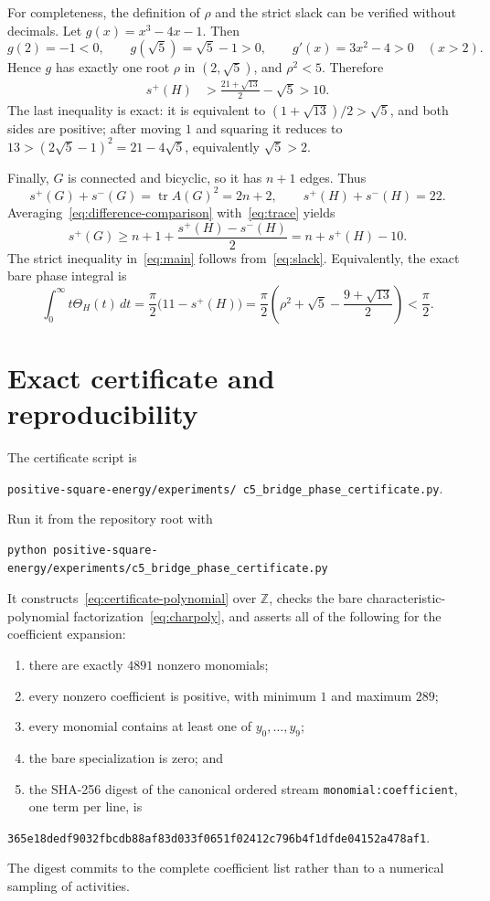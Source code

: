 \documentclass[11pt]{article}
\theoremstyle{remark}
\newcommand{\tr}{\operatorname{tr}}
\begin{document}
For completeness, the definition of $\rho$ and the strict slack can be
verified without decimals.  Let $g(x)=x^3-4x-1$.  Then
\[
 g(2)=-1<0,
 \qquad
 g(\sqrt5)=\sqrt5-1>0,
 \qquad
 g'(x)=3x^2-4>0\quad(x>2).
\]
Hence $g$ has exactly one root $\rho$ in $(2,\sqrt5)$, and $\rho^2<5$.
Therefore
\begin{align}
 s^+(H)
 &>\frac{21+\sqrt{13}}2-\sqrt5>10.\label{eq:slack}
\end{align}
The last inequality is exact: it is equivalent to
$(1+\sqrt{13})/2>\sqrt5$, and both sides are positive; after moving $1$ and
squaring it reduces to $13>(2\sqrt5-1)^2=21-4\sqrt5$, equivalently
$\sqrt5>2$.

Finally, $G$ is connected and bicyclic, so it has $n+1$ edges.  Thus
\begin{equation}\label{eq:trace}
 s^+(G)+s^-(G)=\tr A(G)^2=2n+2,
 \qquad
 s^+(H)+s^-(H)=22.
\end{equation}
Averaging~\eqref{eq:difference-comparison} with~\eqref{eq:trace} yields
\[
 s^+(G)\geq n+1+\frac{s^+(H)-s^-(H)}2
          =n+s^+(H)-10.
\]
The strict inequality in~\eqref{eq:main} follows from~\eqref{eq:slack}.
Equivalently, the exact bare phase integral is
\[
 \int_0^\infty t\Theta_H(t)\,dt
 =\frac\pi2\bigl(11-s^+(H)\bigr)
 =\frac\pi2\left(
 \rho^2+\sqrt5-\frac{9+\sqrt{13}}2\right)<\frac\pi2.
\]

\appendix
\section{Exact certificate and reproducibility}\label{app:certificate}

The certificate script is
\begin{center}
\texttt{positive-square-energy/experiments/\allowbreak
c5\_bridge\_phase\_certificate.py}.
\end{center}
Run it from the repository root with
\begin{verbatim}
python positive-square-energy/experiments/c5_bridge_phase_certificate.py
\end{verbatim}
It constructs~\eqref{eq:certificate-polynomial} over $\mathbb Z$, checks the
bare characteristic-polynomial factorization~\eqref{eq:charpoly}, and asserts
all of the following for the coefficient expansion:
\begin{enumerate}
\item there are exactly $4891$ nonzero monomials;
\item every nonzero coefficient is positive, with minimum $1$ and maximum
      $289$;
\item every monomial contains at least one of $y_0,\ldots,y_9$;
\item the bare specialization is zero; and
\item the SHA-256 digest of the canonical ordered stream
      \texttt{monomial:coefficient}, one term per line, is
\end{enumerate}
\begin{center}
\texttt{365e18dedf9032fbcdb88af83d033f0651f02412c796b4f1dfde04152a478af1}.
\end{center}
The digest commits to the complete coefficient list rather than to a
numerical sampling of activities.
\end{document}

